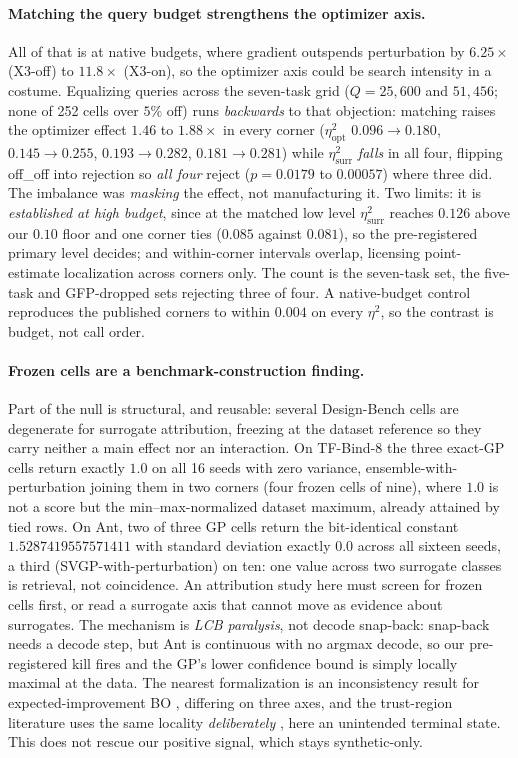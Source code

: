 \documentclass[letterpaper]{article} %
\theoremstyle{plain}
\newcommand{\mdemph}[1]{\emph{#1}}
\begin{document}
\paragraph{Matching the query budget strengthens the optimizer axis.} All of that is at native budgets, where gradient outspends perturbation by $6.25\times$ (X3-off) to $11.8\times$ (X3-on), so the optimizer axis could be search intensity in a costume. Equalizing queries across the seven-task grid ($Q{=}25{,}600$ and $51{,}456$; none of 252 cells over $5\%$ off) runs \mdemph{backwards} to that objection: matching raises the optimizer effect $1.46$ to $1.88\times$ in every corner ($\eta^2_{\text{opt}}$ $0.096\!\to\!0.180$, $0.145\!\to\!0.255$, $0.193\!\to\!0.282$, $0.181\!\to\!0.281$) while $\eta^2_{\text{surr}}$ \mdemph{falls} in all four, flipping off\_off into rejection so \mdemph{all four} reject ($p = 0.0179$ to $0.00057$) where three did. The imbalance was \mdemph{masking} the effect, not manufacturing it. Two limits: it is \mdemph{established at high budget}, since at the matched low level $\eta^2_{\text{surr}}$ reaches $0.126$ above our $0.10$ floor and one corner ties ($0.085$ against $0.081$), so the pre-registered primary level decides; and within-corner intervals overlap, licensing point-estimate localization across corners only. The count is the seven-task set, the five-task and GFP-dropped sets rejecting three of four. A native-budget control reproduces the published corners to within $0.004$ on every $\eta^2$, so the contrast is budget, not call order.

\paragraph{Frozen cells are a benchmark-construction finding.} Part of the null is structural, and reusable: several Design-Bench cells are degenerate for surrogate attribution, freezing at the dataset reference so they carry neither a main effect nor an interaction. On TF-Bind-8 the three exact-GP cells return exactly $1.0$ on all 16 seeds with zero variance, ensemble-with-perturbation joining them in two corners (four frozen cells of nine), where $1.0$ is not a score but the min--max-normalized dataset maximum, already attained by tied rows. On Ant, two of three GP cells return the bit-identical constant $1.5287419557571411$ with standard deviation exactly $0.0$ across all sixteen seeds, a third (SVGP-with-perturbation) on ten: one value across two surrogate classes is retrieval, not coincidence. An attribution study here must screen for frozen cells first, or read a surrogate axis that cannot move as evidence about surrogates. The mechanism is \mdemph{LCB paralysis}, not decode snap-back: snap-back needs a decode step, but Ant is continuous with no argmax decode, so our pre-registered kill fires and the GP's lower confidence bound is simply locally maximal at the data. The nearest formalization is an inconsistency result for expected-improvement BO \citep{yarotsky2013inconsistency}, differing on three axes, and the trust-region literature uses the same locality \mdemph{deliberately} \citep{eriksson2019turbo}, here an unintended terminal state. This does not rescue our positive signal, which stays synthetic-only.
\end{document}
